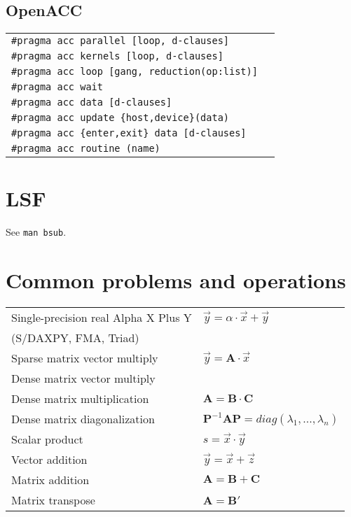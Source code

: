 \documentclass[11pt]{article}
\begin{document}
\subsection{OpenACC}

\begin{tabular}{ p{7cm} l }
	\lstinline$#pragma acc parallel [loop, d-clauses]$ & \\
	\lstinline$#pragma acc kernels [loop, d-clauses]$ & \\
	\lstinline$#pragma acc loop [gang, reduction(op:list)]$ & \\
	\lstinline$#pragma acc wait$ & \\
	\lstinline$#pragma acc data [d-clauses]$ & \\
	\lstinline$#pragma acc update {host,device}(data)$ & \\
	\lstinline$#pragma acc {enter,exit} data [d-clauses]$ & \\
	\lstinline$#pragma acc routine (name)$ & \\
\end{tabular}

\section{LSF}

See \texttt{man bsub}.

\section{Common problems and operations}

\begin{tabular}{ p{7cm} l }
	Single-precision real Alpha X Plus Y & \( \vec{y} = \alpha \cdot \vec{x} + \vec{y} \) \\
	(S/DAXPY, FMA, Triad) & \\
	Sparse matrix vector multiply & \( \vec{y} = \mathbf{A} \cdot \vec{x} \) \\
	Dense matrix vector multiply & \\
	Dense matrix multiplication & \( \mathbf{A} = \mathbf{B} \cdot \mathbf{C} \) \\
	Dense matrix diagonalization & \( \mathbf{P}^{-1} \mathbf{A} \mathbf{P} = diag(\lambda_1, ..., \lambda_n) \) \\
	Scalar product & \( s = \vec{x} \cdot \vec{y} \) \\
	Vector addition & \( \vec{y} = \vec{x} + \vec{z} \) \\
	Matrix addition & \( \mathbf{A} = \mathbf{B} + \mathbf{C} \) \\
	Matrix transpose & \( \mathbf{A} = \mathbf{B}' \) \\
\end{tabular}
\end{document}
